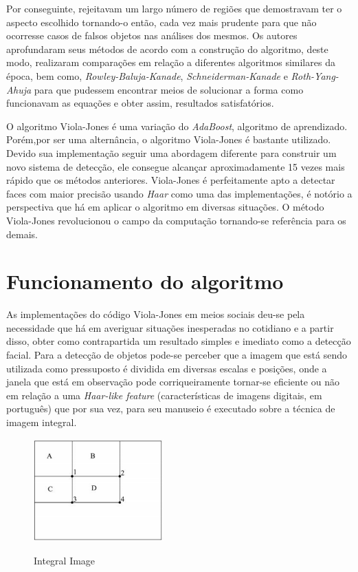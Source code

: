 \documentclass[12pt,a4paper]{article}
\begin{document}
	Por conseguinte, rejeitavam um largo número de regiões que demostravam ter o aspecto escolhido tornando-o então, cada vez mais prudente para que não ocorresse casos de falsos objetos nas análises dos mesmos. Os autores aprofundaram seus métodos de acordo com a construção do algoritmo, deste modo, realizaram comparações em relação a diferentes algoritmos similares da época, bem como, \textit{Rowley-Baluja-Kanade}, \textit{Schneiderman-Kanade} e\textit{ Roth-Yang-Ahuja} para que pudessem encontrar meios de solucionar a forma como funcionavam as equações e obter assim, resultados satisfatórios. 

	O algoritmo Viola-Jones é uma variação do \textit{AdaBoost}, algoritmo de aprendizado. Porém,por ser uma alternância, o algoritmo Viola-Jones é bastante utilizado. Devido sua implementação seguir uma abordagem diferente para construir um novo sistema de detecção, ele consegue alcançar aproximadamente 15 vezes mais rápido que os métodos anteriores. Viola-Jones é perfeitamente apto a detectar faces com maior precisão usando \textit{Haar} como uma das implementações, é notório a perspectiva que há em aplicar o algoritmo em diversas situações. O método Viola-Jones revolucionou o campo da computação tornando-se referência para os demais. 

\section{Funcionamento do algoritmo} 

As implementações do código Viola-Jones em meios sociais deu-se pela necessidade que há em averiguar situações inesperadas no cotidiano e a partir disso, obter como contrapartida um resultado simples e imediato como a detecção facial. Para a detecção de objetos pode-se perceber que a imagem que está sendo utilizada como pressuposto é dividida em diversas escalas e posições, onde a janela que está em observação pode corriqueiramente tornar-se eficiente ou não em relação a uma \textit{Haar-like feature} (características de imagens digitais, em português) que por sua vez, para seu manuseio é executado sobre a técnica de imagem integral.

\begin{figure}[h!]
\centering
\includegraphics[width=5cm]{recursos/imagens/Integral.png}
\label{Integral Image}
\caption{Integral Image}
\end{figure} 
\end{document}
